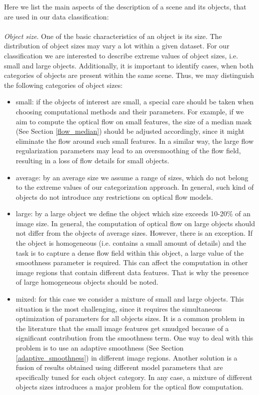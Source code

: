 Here we list the main aspects of the description of a scene and its objects, that are used in our data classification:
\\
\\
\textit{Object size}.  One of the basic characteristics of an object is its size. The distribution of object sizes may vary a lot within a given dataset. For our classification we are interested to describe extreme values of object sizes, i.e. small and large objects. Additionally, it is important to identify cases, when both categories of objects are present within the same scene.   
Thus, we may distinguish the following categories of object sizes:
\begin{itemize}
	\item small: if the objects of interest are small, a special care should be taken when choosing computational methods and their parameters. For example, if we aim to compute the optical flow on small features, the size of a median mask (See Section \ref{flow_median}) should be adjusted accordingly, since it might eliminate the flow around such small features. In a similar way, the large flow regularization parameters may lead to an oversmoothing of the flow field, resulting in a loss of flow details for small objects.
	
	\item average: by an average size we assume a range of sizes, which do not belong to the extreme values of our categorization approach. In general, such kind of objects do not introduce any restrictions on optical flow models.   
	
	\item large: by a large object we define the object which size exceeds 10-20\% of an image size. In general, the computation of optical flow on large objects should not differ from the objects of average sizes. However, there is an exception. If the object is homogeneous (i.e. contains a small amount of details) and the task is to capture a dense flow field within this object, a large value of the smoothness parameter is required. This can affect the computation in other image regions that contain different data features. That is why the presence of large homogeneous objects should be noted. 
	
	\item mixed: for this case we consider a mixture of small and large objects. This situation is the most challenging, since it requires the simultaneous optimization of parameters for all objects sizes. It is a common problem in the literature that the small image features get smudged because of a significant contribution from the smoothness term. One way to deal with this problem is to use an adaptive smoothness (See Section \ref{adaptive_smoothness}) in different image regions. Another solution is a fusion of results obtained using different model parameters that are specifically tuned for each object category. In any case, a mixture of different objects sizes introduces a major problem for the optical flow computation.   
\end{itemize}

